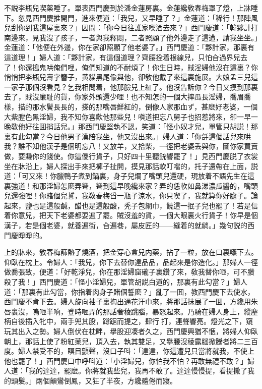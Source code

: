 不説李瓶兒喫薬睡了。單表西門慶到於潘金蓮房裏。金蓮纔敎春梅罩了燈，上牀睡下。忽見西門慶推開門，進來便道：「我兒，又早睡了？」金蓮道：「稀行！那陣風兒刮你到我這屋裏來？」因問：「你今日往誰家喫酒去來？」西門慶道：「韓夥計打南邊來，見我沒了孩子，一者與我釋悶，二者照顧了他外邊走了這遭，請我坐坐。」金蓮道：「他便在外邊，你在家卻照顧了他老婆了。」西門慶道：「夥計家，那裏有這道理！」婦人道：「夥計家，有這個道理？齊腰拴着根線兒，只怕㒲過界兒去了！你還搗鬼哄俺們哩，俺們知道的不耐煩了！你生日時，賊淫婦他沒在這裏？你悄悄把李瓶兒壽字簪子，黄貓黑尾偸與他，卻敎他戴了來這裏施展。大娘孟三兒這一家子那個沒看見？乞我相問着，他那臉兒上紅了。他沒告訴你？今日又摸到那裏去了，賊沒廉耻的貨，你家外頭還少哩！也不知怎的一個大摔瓜長淫婦，喬眉喬樣，描的那水鬢長長的，搽的那嘴唇鮮紅的，倒像人家那血ず，甚麽好老婆，一個大紫膛色黑淫婦，我不知你喜歡他那些兒！嗔道把忘八舅子也招惹將來，卻一早一晚敎他好往囬捎話兒。」那西門慶堅執不認，笑道：「怪小奴才兒，單管只胡説！那裏有此勾當？今日他男子漢陪我坐，他又沒出來。」婦人道：「你㧱這個話兒來哄我？誰不知他漢子是個明忘八！又放羊，又拾柴，一徑把老婆丢與你，圖你家買賣做，要賺你的錢使。你這儍行貨子，只好四十里聽銃響罷了！」見西門慶脱了衣裳坐在牀沿上，婦人探出手來把褲子扯開，摸見那話軟叮噹的，托子還帶在上面，説道：「可又來！你臘鴨子煮到鍋裏，身子兒爛了嘴頭兒還硬，現放着不語先生在這裏強道！和那淫婦怎麽弄聳，聳到這早晚纔來家？弄的恁軟如鼻涕濃瓜醬的，嘴頭兒還強哩！你賭個兒誓，我敎春梅舀一瓶子涼水，你只喫了，我就算你好膽子。論起來，鹽也是這般鹹，醋也是這般酸，秃子包網巾，饒這一抿子兒也罷了！若是信着你意兒，把天下老婆都耍遍了罷。賊沒羞的貨，一個大眼裏火行貨子！你早是個漢子，若是個老婆，就養遍街，㒲遍巷，屬皮匠的——縫着的就緔。」幾句説的西門慶睜睜的。

上的牀來，敎春梅篩熱了燒酒，把金穿心盒兒内薬，拈了一粒，放在口裏嚥下去。仰臥在枕上。令婦人：「我兒，你下去替你達品品，品起來是你造化。」那婦人一徑做喬張致，便道：「好乾淨兒，你在那淫婦窟礲子裏鑽了來，敎我替你咂，可不臢殺了我！」西門慶道：「怪小淫婦兒，單管胡説白道的，那裏有此勾當？」婦人道：「那裏有此勾當，你指着肉身子賭個誓麽？」亂了一囬，教西門慶下去使水，西門慶不肯下去。婦人旋向袖子裏掏出通花汗巾來，將那話抹展了一囬，方纔用朱唇裹沒，嗚咂半响，登時咂弄的那話奢稜跳腦，暴怒起來。乃騎在婦人身上，縱麈柄自後插入牝中，兩手兜其股，蹲踞而提之，肆行𢵞打，連聲響亮。燈光之下，窺玩其出入之勢。婦人倒伏在枕畔，擧股迎凑者久之，西門慶興猶不愜，將婦人仰臥朝上，那話上使了粉紅薬兒，頂入去，執其雙足，又擧腰沒稜露腦掀騰者將二三百度。婦人禁受不的，瞑目顫聲，沒口子呌：「達達，你這遭兒只當將就我，不使上他也罷了！」西門慶口中呼呌道：「小淫婦兒，你怕我不怕？再敢無禮不敢？」婦人道：「我的達達，罷麽。你將就我些兒，我再不敢了。達達慢慢提，看提撒了我的頭髮。」兩個顛鸞倒鳳，又狂了半夜，方纔體倦而寢。

